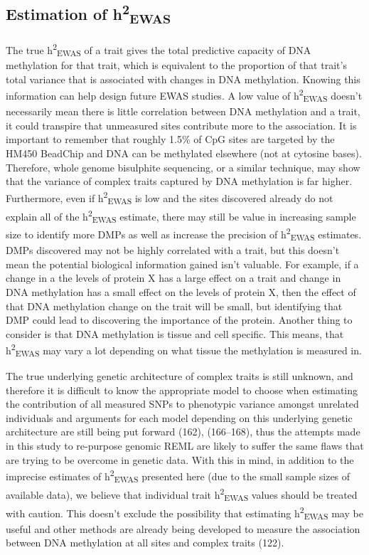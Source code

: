 \documentclass[11pt,oneside]{bristolthesis}
\begin{document}
\hypertarget{estimation-of-h2ewas}{%
\subsection{\texorpdfstring{Estimation of h\textsuperscript{2}\textsubscript{EWAS}}{Estimation of h2EWAS}}\label{estimation-of-h2ewas}}

The true h\textsuperscript{2}\textsubscript{EWAS} of a trait gives the total predictive capacity of DNA methylation for that trait, which is equivalent to the proportion of that trait's total variance that is associated with changes in DNA methylation. Knowing this information can help design future EWAS studies. A low value of h\textsuperscript{2}\textsubscript{EWAS} doesn't necessarily mean there is little correlation between DNA methylation and a trait, it could transpire that unmeasured sites contribute more to the association. It is important to remember that roughly 1.5\% of CpG sites are targeted by the HM450 BeadChip and DNA can be methylated elsewhere (not at cytosine bases). Therefore, whole genome bisulphite sequencing, or a similar technique, may show that the variance of complex traits captured by DNA methylation is far higher. Furthermore, even if h\textsuperscript{2}\textsubscript{EWAS} is low and the sites discovered already do not explain all of the h\textsuperscript{2}\textsubscript{EWAS} estimate, there may still be value in increasing sample size to identify more DMPs as well as increase the precision of h\textsuperscript{2}\textsubscript{EWAS} estimates. DMPs discovered may not be highly correlated with a trait, but this doesn't mean the potential biological information gained isn't valuable. For example, if a change in a the levels of protein X has a large effect on a trait and change in DNA methylation has a small effect on the levels of protein X, then the effect of that DNA methylation change on the trait will be small, but identifying that DMP could lead to discovering the importance of the protein. Another thing to consider is that DNA methylation is tissue and cell specific. This means, that h\textsuperscript{2}\textsubscript{EWAS} may vary a lot depending on what tissue the methylation is measured in.

The true underlying genetic architecture of complex traits is still unknown, and therefore it is difficult to know the appropriate model to choose when estimating the contribution of all measured SNPs to phenotypic variance amongst unrelated individuals and arguments for each model depending on this underlying genetic architecture are still being put forward (162), (166--168), thus the attempts made in this study to re-purpose genomic REML are likely to suffer the same flaws that are trying to be overcome in genetic data. With this in mind, in addition to the imprecise estimates of h\textsuperscript{2}\textsubscript{EWAS} presented here (due to the small sample sizes of available data), we believe that individual trait h\textsuperscript{2}\textsubscript{EWAS} values should be treated with caution. This doesn't exclude the possibility that estimating h\textsuperscript{2}\textsubscript{EWAS} may be useful and other methods are already being developed to measure the association between DNA methylation at all sites and complex traits (122).
\end{document}

